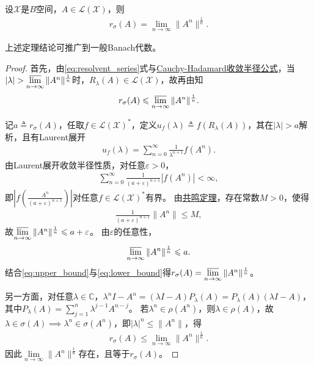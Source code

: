 \documentclass[../../main.tex]{subfiles}%
\begin{document}
\begin{theorem}[Gelfand定理]\label{theorem:泛函分析--Gelfand定理}
设$\mathscr{X}$是$B$空间，$A\in\mathscr{L}(\mathscr{X})$，则
\begin{align}
r_{\sigma}(A)=\lim\limits_{n\to\infty}\|A^n\|^{\frac{1}{n}}.\label{eq:gelfand_formula}
\end{align}
\end{theorem}
\begin{remark}
上述定理结论可推广到一般Banach代数。
\end{remark}
\begin{proof}

首先，由\eqref{eq:resolvent_series}式与\hyperref[Complex-Analysis-theorem:Cauchy-Hadamard收敛半径公式]{Cauchy-Hadamard收敛半径公式}，当$|\lambda|>\varlimsup\limits_{n\to\infty}\|A^n\|^{\frac{1}{n}}$时，$R_{\lambda}(A)\in\mathscr{L}(\mathscr{X})$，故再由知
\begin{align}
r_{\sigma}(A)\leqslant\varlimsup\limits_{n\to\infty}\|A^n\|^{\frac{1}{n}}.\label{eq:upper_bound}
\end{align}

记$a\triangleq r_{\sigma}(A)$，任取$f\in\mathscr{L}(\mathscr{X})^*$，定义$u_f(\lambda)\triangleq f(R_{\lambda}(A))$，其在$|\lambda|>a$解析，且有Laurent展开
\begin{align*}
u_f(\lambda)=\sum\limits_{n=0}^{\infty}\frac{1}{\lambda^{n+1}}f(A^n).
\end{align*}
由Laurent展开收敛半径性质，对任意$\varepsilon>0$，
\begin{align*}
\sum\limits_{n=0}^{\infty}\frac{1}{(a+\varepsilon)^{n+1}}|f(A^n)|<\infty,
\end{align*}
即$\left|f\left(\frac{A^n}{(a+\varepsilon)^{n+1}}\right)\right|$对任意$f\in\mathscr{L}(\mathscr{X})^*$有界。
由\hyperref[theorem:泛函分析--共鸣定理]{共鸣定理}，存在常数$M>0$，使得
\begin{align*}
\frac{1}{(a+\varepsilon)^{n+1}}\|A^n\|\leqslant M,
\end{align*}
故$\varlimsup\limits_{n\to\infty}\|A^n\|^{\frac{1}{n}}\leqslant a+\varepsilon$。
由$\varepsilon$的任意性，
\begin{align}
\varlimsup\limits_{n\to\infty}\|A^n\|^{\frac{1}{n}}\leqslant a.\label{eq:lower_bound}
\end{align}
结合\eqref{eq:upper_bound}与\eqref{eq:lower_bound}得$r_{\sigma}(A)=\varlimsup\limits_{n\to\infty}\|A^n\|^{\frac{1}{n}}$。

另一方面，对任意$\lambda\in\mathbb{C}$，$\lambda^n I-A^n=(\lambda I-A)P_{\lambda}(A)=P_{\lambda}(A)(\lambda I-A)$，其中$P_{\lambda}(A)=\sum\limits_{j=1}^{n}\lambda^{j-1}A^{n-j}$。
若$\lambda^n\in\rho(A^n)$，则$\lambda\in\rho(A)$，故$\lambda\in\sigma(A)\implies\lambda^n\in\sigma(A^n)$，即$|\lambda|^n\leqslant\|A^n\|$，得
\begin{align}
r_{\sigma}(A)\leqslant\lim\limits_{n\to\infty}\|A^n\|^{\frac{1}{n}}.\label{eq:lim_bound}
\end{align}
因此$\lim\limits_{n\to\infty}\|A^n\|^{\frac{1}{n}}$存在，且等于$r_{\sigma}(A)$。

\end{proof}
\end{document}
